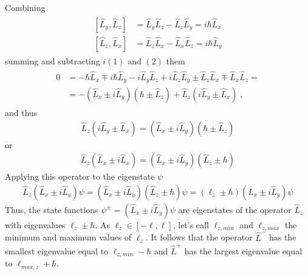 \documentclass[letterpaper,10pt,english]{jupyterBook}
\begin{document}
\sphinxAtStartPar
Combining
\begin{equation*}
\begin{split}\begin{aligned}
  \left[\hat{L}_y, \hat{L}_z \right] & = \hat{L}_y \hat{L}_z - \hat{L}_z \hat{L}_y = i \hbar \hat{L}_x \\
  \left[\hat{L}_z, \hat{L}_x \right] & = \hat{L}_z \hat{L}_x - \hat{L}_x \hat{L}_z = i \hbar \hat{L}_y
\end{aligned}\end{split}
\end{equation*}
\sphinxAtStartPar
summing and subtracting \(i (1)\) and \((2)\) them
\begin{equation*}
\begin{split}\begin{aligned}
 0
 & = - \hbar \hat{L}_x \mp i \hbar \hat{L}_y - i \hat{L}_y \hat{L}_z + i \hat{L}_z \hat{L}_y \pm \hat{L}_z \hat{L}_x \mp \hat{L}_x \hat{L}_z = \\
 & = - ( \hat{L}_x \pm i \hat{L}_y ) ( \hbar \pm \hat{L}_z ) + \hat{L}_z ( i \hat{L}_y \pm \hat{L}_x ) \ ,
\end{aligned}\end{split}
\end{equation*}
\sphinxAtStartPar
and thus
\begin{equation*}
\begin{split}\hat{L}_z ( i \hat{L}_y \pm \hat{L}_x ) = ( \hat{L}_x \pm i \hat{L}_y ) ( \hbar \pm \hat{L}_z )\end{split}
\end{equation*}
\sphinxAtStartPar
or
\begin{equation*}
\begin{split}\hat{L}_z ( \hat{L}_x \pm i \hat{L}_x ) = ( \hat{L}_x \pm i \hat{L}_y ) ( \hat{L}_z \pm \hbar )\end{split}
\end{equation*}
\sphinxAtStartPar
Applying this operator to the eigenstate \(\psi\)
\begin{equation}\label{equation:ch/quantum-mechanics/angular-momentum/angular-momentum-spatial:eq:ang-mom:ladder:application}
\begin{split}\hat{L}_z ( \hat{L}_x \pm i \hat{L}_y ) \psi = ( \hat{L}_x \pm i \hat{L}_y ) ( \hat{L}_z \pm \hbar ) \psi = ( \ell_z \pm \hbar ) ( \hat{L}_x \pm i \hat{L}_y ) \psi\end{split}
\end{equation}
\sphinxAtStartPar
Thus, the state functions \(\psi^{\pm} = \left( \hat{L}_x \pm i \hat{L}_y \right) \psi\) are eigenstates of the operator \(\hat{L}_z\) with eigenvalues \(\ell_z \pm \hbar\). As \(\ell_z \in [ - \ell, \ell ]\), let’s call \(\ell_{z,min}\) and \(\ell_{z,max}\) the minimum and maximum values of \(\ell_z\). It follows that the operator \(\hat{L}^-\) has the smallest eigenvalue equal to \(\ell_{z,min} - \hbar\) and \(\hat{L}^+\) has the largest eigenvalue equal to \(\ell_{max,z} + \hbar\).
\end{document}
